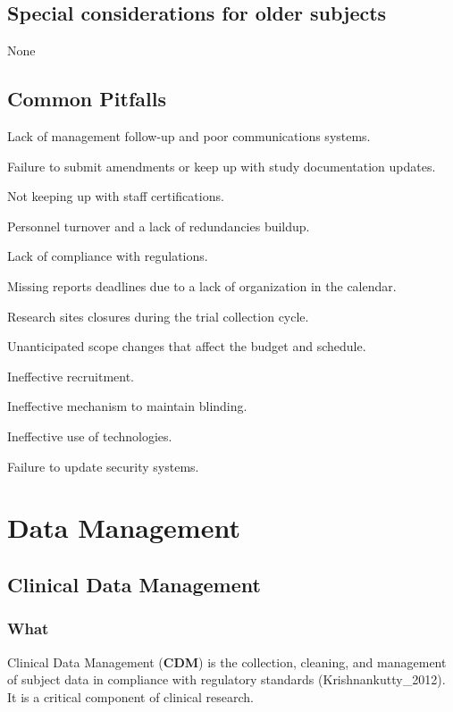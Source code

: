 \documentclass[]{book}
\begin{document}
\section{Special considerations for older
subjects}\label{special-considerations-for-older-subjects-12}

None

\section{Common Pitfalls}\label{common-pitfalls-15}

Lack of management follow-up and poor communications systems.

Failure to submit amendments or keep up with study documentation
updates.

Not keeping up with staff certifications.

Personnel turnover and a lack of redundancies buildup.

Lack of compliance with regulations.

Missing reports deadlines due to a lack of organization in the calendar.

Research sites closures during the trial collection cycle.

Unanticipated scope changes that affect the budget and schedule.

Ineffective recruitment.

Ineffective mechanism to maintain blinding.

Ineffective use of technologies.

Failure to update security systems.

\chapter{Data Management}\label{data-management}

\section{Clinical Data Management}\label{clinical-data-management}

\subsection{What}\label{what-17}

Clinical Data Management (\textbf{CDM}) is the collection, cleaning, and
management of subject data in compliance with regulatory standards
(Krishnankutty\_2012). It is a critical component of clinical research.
\end{document}
